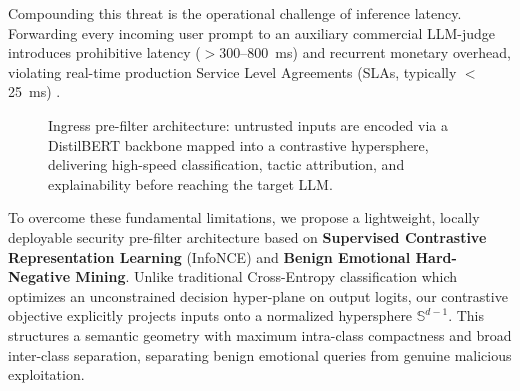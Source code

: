 \documentclass[journal]{IEEEtran}
\begin{document}
Compounding this threat is the operational challenge of inference latency. Forwarding every incoming user prompt to an auxiliary commercial LLM-judge introduces prohibitive latency ($>$300--800~ms) and recurrent monetary overhead, violating real-time production Service Level Agreements (SLAs, typically $<$25~ms) \cite{kumar2024empirical}.

\begin{figure}[t]
\centering
\fbox{\rule{0pt}{2.2in} \rule{0.92\linewidth}{0pt}}
\caption{Ingress pre-filter architecture: untrusted inputs are encoded via a DistilBERT backbone mapped into a contrastive hypersphere, delivering high-speed classification, tactic attribution, and explainability before reaching the target LLM.}
\label{fig:arch}
\end{figure}

To overcome these fundamental limitations, we propose a lightweight, locally deployable security pre-filter architecture based on \textbf{Supervised Contrastive Representation Learning} (InfoNCE) \cite{khosla2023supervised} and \textbf{Benign Emotional Hard-Negative Mining}. Unlike traditional Cross-Entropy classification which optimizes an unconstrained decision hyper-plane on output logits, our contrastive objective explicitly projects inputs onto a normalized hypersphere $\mathbb{S}^{d-1}$. This structures a semantic geometry with maximum intra-class compactness and broad inter-class separation, separating benign emotional queries from genuine malicious exploitation.
\end{document}
